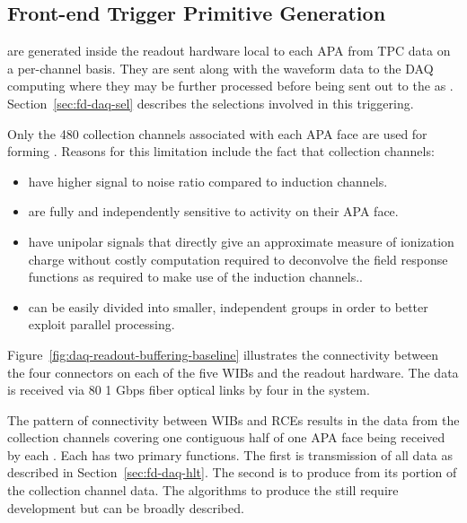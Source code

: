 
\subsection{Front-end Trigger Primitive Generation}
\label{sec:fd-daq-ltp}


 are generated inside the  readout
hardware local to each APA from TPC data on a per-channel basis.
They are sent along with the waveform data to the  DAQ
computing where they may be further processed before being sent out to
the  as .  
Section~\ref{sec:fd-daq-sel} describes the selections involved in
this triggering.

Only the 480 collection channels associated with each APA face are
used for forming . 
Reasons for this limitation include the fact that collection
channels:

\begin{itemize}
\item have higher signal to noise ratio compared to induction channels.
\item are fully and independently sensitive to activity on their APA face.
\item have unipolar signals that directly give an approximate measure
  of ionization charge without costly computation required to
  deconvolve the field response functions as required to make use of
  the induction channels..
\item can be easily divided into smaller, independent groups in order
  to better exploit parallel processing.
\end{itemize}


Figure~\ref{fig:daq-readout-buffering-baseline} illustrates the connectivity between the
four connectors on each of the five WIBs and the  readout hardware.
The data is received via 80 1 Gbps fiber optical links by four 
in the   system. 

The pattern of connectivity between WIBs and RCEs results in the data
from the collection channels covering one contiguous half of one APA
face being received by each .
Each  has two primary functions. 
The first is transmission of all data as described in
Section~\ref{sec:fd-daq-hlt}. 
The second is to produce  from its portion of the
collection channel data.
The algorithms to produce the  still require
development but can be broadly described.   

